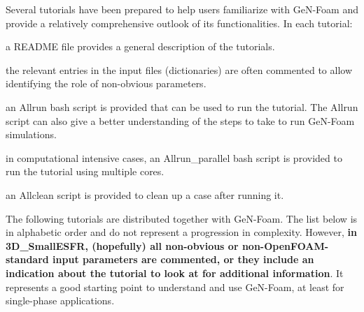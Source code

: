 Several tutorials have been prepared to help users familiarize with Ge\+N-\/\+Foam and provide a relatively comprehensive outlook of its functionalities. In each tutorial\+:
\begin{DoxyItemize}
\item a R\+E\+A\+D\+ME file provides a general description of the tutorials.
\item the relevant entries in the input files (dictionaries) are often commented to allow identifying the role of non-\/obvious parameters.
\item an Allrun bash script is provided that can be used to run the tutorial. The Allrun script can also give a better understanding of the steps to take to run Ge\+N-\/\+Foam simulations.
\item in computational intensive cases, an Allrun\+\_\+parallel bash script is provided to run the tutorial using multiple cores.
\item an Allclean script is provided to clean up a case after running it.
\end{DoxyItemize}

The following tutorials are distributed together with Ge\+N-\/\+Foam. The list below is in alphabetic order and do not represent a progression in complexity. However, {\bfseries in 3\+D\+\_\+\+Small\+E\+S\+FR, (hopefully) all non-\/obvious or non-\/\+Open\+F\+O\+A\+M-\/standard input parameters are commented, or they include an indication about the tutorial to look at for additional information}. It represents a good starting point to understand and use Ge\+N-\/\+Foam, at least for single-\/phase applications.


